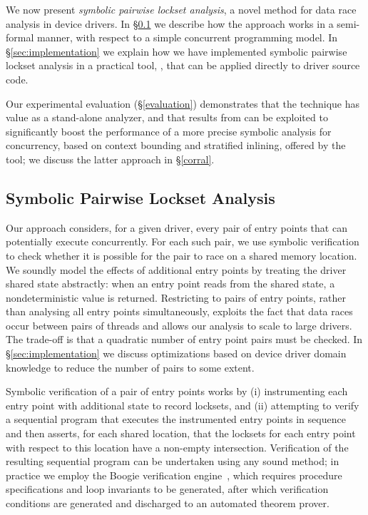 
We now present \emph{symbolic pairwise lockset analysis}, a novel method for data race analysis in device drivers.  In \S\ref{sec:symbolicpairwise} we describe how the approach works in a semi-formal manner, with respect to a simple concurrent programming model.  In \S\ref{sec:implementation} we explain how we have implemented symbolic pairwise lockset analysis in a practical tool, \whoop, that can be applied directly to driver source code.

Our experimental evaluation (\S\ref{evaluation}) demonstrates that the \whoop technique has value as a stand-alone analyzer, and that results from \whoop can be exploited to significantly boost the performance of a more precise symbolic analysis for concurrency, based on context bounding and stratified inlining, offered by the \corral~\cite{lal2012corral} tool; we discuss the latter approach in \S\ref{corral}.

\subsection{Symbolic Pairwise Lockset Analysis}
\label{sec:symbolicpairwise}

Our approach considers, for a given driver, every pair of entry points that can potentially execute concurrently.  For each such pair, we use symbolic verification to check whether it is possible for the pair to race on a shared memory location. We soundly model the effects of additional entry points by treating the driver shared state abstractly: when an entry point reads from the shared state, a nondeterministic value is returned.  Restricting to pairs of entry points, rather than analysing all entry points simultaneously, exploits the fact that data races occur between pairs of threads and allows our analysis to scale to large drivers.  The trade-off is that a quadratic number of entry point pairs must be checked.  In \S\ref{sec:implementation} we discuss optimizations based on device driver domain knowledge to reduce the number of pairs to some extent.

Symbolic verification of a pair of entry points works by (i) instrumenting each entry point with additional state to record locksets, and (ii) attempting to verify a sequential program that executes the instrumented entry points in sequence and then asserts, for each shared location, that the locksets for each entry point with respect to this location have a non-empty intersection.  Verification of the resulting sequential program can be undertaken using any sound method; in practice we employ the Boogie verification engine~\cite{barnett2006boogie}, which requires procedure specifications and loop invariants to be generated, after which verification conditions are generated and discharged to an automated theorem prover.

